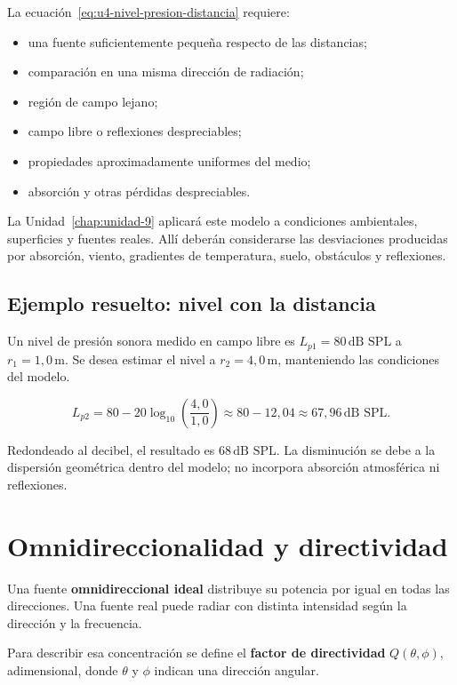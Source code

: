 La ecuación~\eqref{eq:u4-nivel-presion-distancia} requiere:

\begin{itemize}
    \item una fuente suficientemente pequeña respecto de las distancias;
    \item comparación en una misma dirección de radiación;
    \item región de campo lejano;
    \item campo libre o reflexiones despreciables;
    \item propiedades aproximadamente uniformes del medio;
    \item absorción y otras pérdidas despreciables.
\end{itemize}

La Unidad~\ref{chap:unidad-9} aplicará este modelo a condiciones ambientales,
superficies y fuentes reales. Allí deberán considerarse las desviaciones
producidas por absorción, viento, gradientes de temperatura, suelo, obstáculos
y reflexiones.

\subsection{Ejemplo resuelto: nivel con la distancia}
\label{sec:u4-ejemplo-distancia}

Un nivel de presión sonora medido en campo libre es
\(L_{p1}=80\,\text{dB SPL}\) a \(r_1=1{,}0\,\text{m}\). Se desea estimar el
nivel a \(r_2=4{,}0\,\text{m}\), manteniendo las condiciones del modelo.

\[
    L_{p2}
      =80-20\log_{10}\!\left(\frac{4{,}0}{1{,}0}\right)
      \approx80-12{,}04
      \approx67{,}96\,\text{dB SPL}.
\]

Redondeado al decibel, el resultado es \(68\,\text{dB SPL}\). La disminución
se debe a la dispersión geométrica dentro del modelo; no incorpora absorción
atmosférica ni reflexiones.

\section{Omnidireccionalidad y directividad}
\label{sec:u4-directividad}

Una fuente \textbf{omnidireccional ideal} distribuye su potencia por igual en
todas las direcciones. Una fuente real puede radiar con distinta intensidad
según la dirección y la frecuencia.

Para describir esa concentración se define el \textbf{factor de directividad}
\(Q(\theta,\phi)\), adimensional, donde \(\theta\) y \(\phi\) indican una
dirección angular. 

